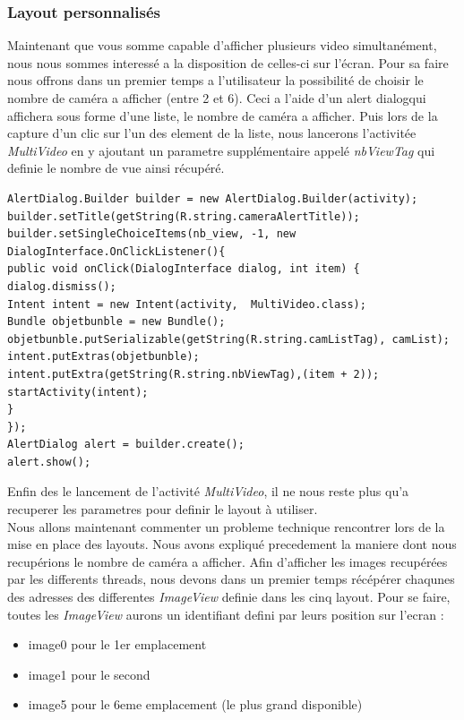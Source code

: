 \subsubsection{Layout personnalisés}
Maintenant que vous somme capable d'afficher plusieurs video simultanément,
nous nous sommes interessé a la disposition de celles-ci sur l'écran.
Pour sa faire nous offrons dans un premier temps a l'utilisateur la possibilité
de choisir le nombre de caméra a afficher (entre 2 et 6).\newline
Ceci a l'aide d'un alert dialogqui affichera sous forme d'une liste, le nombre
de caméra a afficher. Puis lors de la capture d'un clic sur l'un des element de
la liste, nous lancerons l'activitée \textit{MultiVideo} en y ajoutant un
parametre supplémentaire appelé \textit{nbViewTag} qui definie le nombre de vue
ainsi récupéré.
\begin{changemargin}{0cm}{-2cm}
\begin{lstlisting}[caption={Multi-Video launcher}] 
AlertDialog.Builder builder = new AlertDialog.Builder(activity);
builder.setTitle(getString(R.string.cameraAlertTitle));
builder.setSingleChoiceItems(nb_view, -1, new DialogInterface.OnClickListener(){ 
public void onClick(DialogInterface dialog, int item) {
dialog.dismiss();
Intent intent = new Intent(activity,  MultiVideo.class);
Bundle objetbunble = new Bundle();
objetbunble.putSerializable(getString(R.string.camListTag), camList);
intent.putExtras(objetbunble);
intent.putExtra(getString(R.string.nbViewTag),(item + 2));
startActivity(intent);
}
});
AlertDialog alert = builder.create();
alert.show();
\end{lstlisting}    
\end{changemargin}
Enfin des le lancement de l'activité \textit{MultiVideo}, il ne nous reste plus
qu'a recuperer les parametres pour definir le layout à utiliser.\\
\newline\indent Nous allons maintenant commenter un probleme technique
rencontrer lors de la mise en place des layouts.
Nous avons expliqué precedement la maniere dont nous recupérions le nombre de
caméra a afficher. Afin d'afficher les images recupérées par les differents
threads, nous devons dans un premier temps récépérer chaqunes des adresses des
differentes \textit{ImageView} definie dans les cinq layout. \newline Pour se
faire, toutes les \textit{ImageView} aurons un identifiant defini par leurs
position sur l'ecran :
\begin{itemize}
\item image0 pour le 1er emplacement
\item image1 pour le second
\item image5 pour le 6eme emplacement (le plus grand disponible)
\end{itemize}
